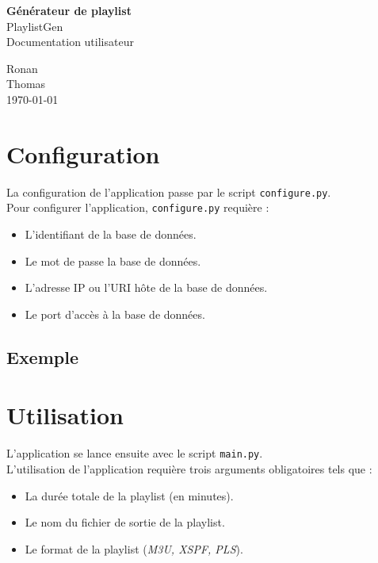 \documentclass[a4paper,titlepage,oneside]{article}
\begin{document}
\pagestyle{empty}

\begin{center}
\vspace{3.5cm}
\Huge{\textbf{Générateur de playlist}}\\
\Huge{PlaylistGen}\\
\vspace{1cm}
\huge{Documentation utilisateur}
\vfill
\end{center}
\begin{flushleft}
Ronan \\
Thomas \\
\hfill
\today
\end{flushleft}
\newpage

\newpage
\pagestyle{fancy}
\setcounter{page}{1}
\tableofcontents{}
\newpage


\section{Configuration}
La configuration de l'application passe par le script \texttt{configure.py}.\\

Pour configurer l'application, \texttt{configure.py} requière :
\begin{itemize}
	\item L'identifiant de la base de données.
	\item Le mot de passe la base de données.
	\item L'adresse IP ou l'URI hôte de la base de données.
	\item Le port d'accès à la base de données.
\end{itemize}

\subsection{Exemple}

\section{Utilisation}
L'application se lance ensuite avec le script \texttt{main.py}.\\

L'utilisation de l'application requière trois arguments obligatoires tels que :
\begin{itemize}
	\item La durée totale de la playlist (en minutes).
	\item Le nom du fichier de sortie de la playlist.
	\item Le format de la playlist (\textit{M3U, XSPF, PLS}).\\
\end{itemize}
\end{document}
